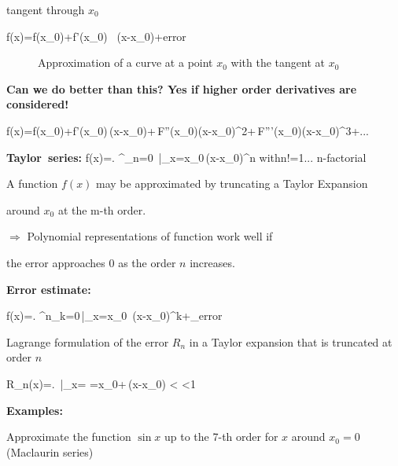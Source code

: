 tangent through $x_0$

\bnn f(x)=f(x_{0})+f'(x_{0}) \, (x-x_{0})+\mbox{error}
\enn



\begin{figure}[!h]

    \centerline{\epsfxsize=12cm  }

    \caption{Approximation of a curve at a point $x_0$ with the tangent at $x_0$} \label{fig58}

\end{figure} \vs \vs



\centerline{\bf Can we do better than this? Yes if higher order derivatives are considered!}

\bnn f(x)=f(x_{0})+f'(x_0)\,(x-x_0)+\,F''(x_0)(x-x_0)^2+\,F'''(x_{0})(x-x_{0})^{3}+... \enn



\bnn
    \mbox{\bf Taylor series:} \qquad f(x)=\left. \sum^{\infty}_{n=0}
    \,\right|_{x=x_0}\,(x-x_0)^n \qquad
    \mbox{with}\quad n!=1\cdot ... \;\;\;\mbox{n-factorial}
\enn



A function $f(x)$ may be approximated by truncating a Taylor Expansion

around $x_{0}$ at the m-th order.



$\Rightarrow$ Polynomial representations of function work well if

the error approaches $0$ as the order $n$ increases.



{\bf Error estimate:}

\bnn
    f(x)=\left. \sum^n_{k=0}\,\right|_{x=x_0} \,(x-x_0)^k+_{\mbox{error}}
\enn



Lagrange formulation of the error $R_n$ in a Taylor expansion that is truncated at order $n$

\bnn
    R_n(x)=\left. \,\right|_{x=\xi} \qquad
    \xi=x_0+\delta\,(x-x_0) < \delta <1
\enn \vs



{\bf Examples:}



Approximate the  function $\sin x$ up to the 7-th order for $x$ around $x_0=0$ (Maclaurin series)

